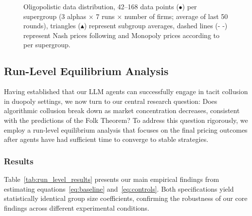 \begin{figure}[H]
    \centering
    
    \caption{Oligopolistic data distribution, 42--168 data points ($\bullet$) per supergroup (3 alphas $\times$ 7 runs $\times$ number of firms; average of last 50 rounds), triangles ($\blacktriangle$) represent subgroup averages, dashed lines ($\text{- -}$) represent Nash prices following  and Monopoly prices according to  per supergroup.}
    \label{fig:oligopols}
\end{figure}


\subsection{Run-Level Equilibrium Analysis}\label{sec:run_level}

Having established that our LLM agents can successfully engage in tacit collusion in duopoly settings, we now turn to our central research question: Does algorithmic collusion break down as market concentration decreases, consistent with the predictions of the Folk Theorem? To address this question rigorously, we employ a run-level equilibrium analysis that focuses on the final pricing outcomes after agents have had sufficient time to converge to stable strategies.

\subsubsection{Results}

Table~\ref{tab:run_level_results} presents our main empirical findings from estimating equations~\eqref{eq:baseline} and~\eqref{eq:controls}. Both specifications yield statistically identical group size coefficients, confirming the robustness of our core findings across different experimental conditions.

